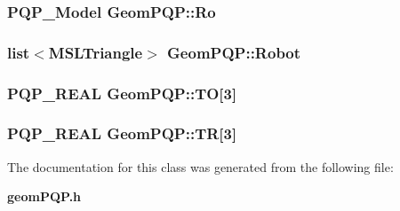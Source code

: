 \subsubsection{\setlength{\rightskip}{0pt plus 5cm}PQP\_\-Model Geom\-PQP::Ro}\label{class_GeomPQP_m2}


\subsubsection{\setlength{\rightskip}{0pt plus 5cm}list$<${\bf MSLTriangle}$>$ Geom\-PQP::Robot}\label{class_GeomPQP_m1}


\subsubsection{\setlength{\rightskip}{0pt plus 5cm}PQP\_\-REAL Geom\-PQP::TO[3]\hspace{0.3cm}{\tt  [protected]}}\label{class_GeomPQP_n3}


\subsubsection{\setlength{\rightskip}{0pt plus 5cm}PQP\_\-REAL Geom\-PQP::TR[3]\hspace{0.3cm}{\tt  [protected]}}\label{class_GeomPQP_n2}




The documentation for this class was generated from the following file:\begin{CompactItemize}
\item 
{\bf geom\-PQP.h}\end{CompactItemize}
